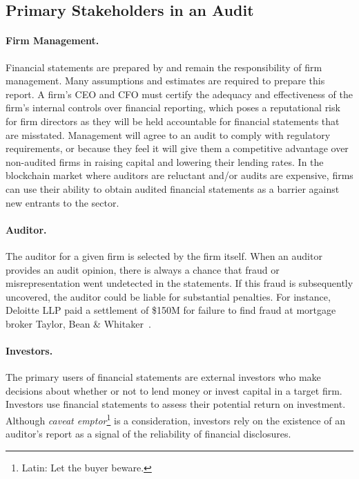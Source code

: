 \subsection{Primary Stakeholders in an Audit}

\paragraph{Firm Management.} Financial statements are prepared by and remain the responsibility of firm management. Many assumptions and estimates are required to prepare this report. A firm's CEO and CFO must certify the adequacy and effectiveness of the firm{'}s internal controls over financial reporting, which poses a reputational risk for firm directors as they will be held accountable for financial statements that are misstated. Management will agree to an audit to comply with regulatory requirements, or because they feel it will give them a competitive advantage over non-audited firms in raising capital and lowering their lending rates. In the blockchain market where auditors are reluctant and/or audits are expensive, firms can use their ability to obtain audited financial statements as a barrier against new entrants to the sector. 

\paragraph{Auditor.} The auditor for a given firm is selected by the firm itself. When an auditor provides an audit opinion, there is always a chance that fraud or misrepresentation went undetected in the statements. If this fraud is subsequently uncovered, the auditor could be liable for substantial penalties. For instance, Deloitte LLP paid a settlement of \$150M for failure to find fraud at mortgage broker Taylor, Bean \& Whitaker~\cite{FTDeloitte2018}.

\paragraph{Investors.} The primary users of financial statements are external investors who make decisions about whether or not to lend money or invest capital in a target firm. Investors use financial statements to assess their potential return on investment. Although \textit{caveat emptor}\footnote{Latin: Let the buyer beware.} is a consideration, investors rely on the existence of an auditor{'}s report as a signal of the reliability of financial disclosures.
 
